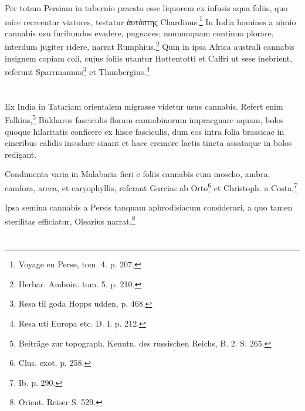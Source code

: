 \documentclass[a4paper, 11pt, oneside, polutonikogreek, english]{article}
\begin{document}
Per totam Persiam in tabernio praesto esse liquorem ex infusis aqua foliis, quo mire recreentur viatores, testatur ἀυτόπτης Chardinus.\footnote{Voyage en Perse, tom. 4. p. 207.} In India homines a nimio cannabis usu furibundos evadere, pugnaces; nonnunquam continuo plorare, interdum jugiter ridere, narrat Rumphius.\footnote{Herbar. Amboin. tom. 5. p. 210.} Quin in ipsa Africa australi cannabis insignem copiam coli, cujus foliis utantur Hottentotti et Caffri ut sese inebrient, referunt Sparrmannus\footnote{Resa til goda Hopps udden, p. 468.} et Thunbergius.\footnote{Resa uti Europa etc. D. I. p. 212.}
\section{}
\paragraph{}
Ex India in Tatariam orientalem migrasse videtur usus cannabis. Refert enim Falkius,\footnote{Beiträge zur topograph. Kenntn. des russischen Reichs, B. 2. S. 265.} Bukharos fasciculis floram cannabinorum impraegnare aquam, bolos quoque hilaritatis conficere ex hisce fasciculis, dum eos intra folia brassicae in cineribus calidis insudare sinant et haec cremore lactis tincta assataque in bolos redigant.

Condimenta varia in Malabaria fieri e foliis cannabis cum moscho, ambra, camfora, areca, et caryophyllis, referant Garcias ab Orto\footnote{Clus. exot. p. 258.} et Christoph. a Costa.\footnote{Ib. p. 290.}

Ipsa semina cannabis a Persis tanquam aphrodisiacum considerari, a quo tamen sterilitas efficiatur, Olearius narrat.\footnote{Orient. Reiser S. 529.}
\section{}
\end{document}
